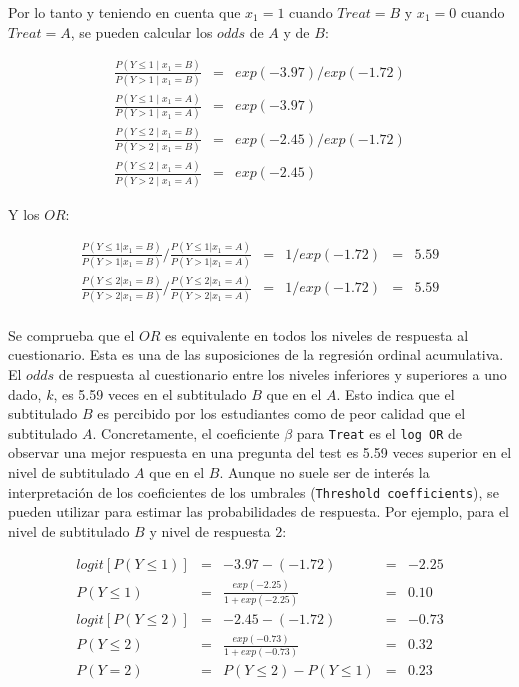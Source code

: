\documentclass[
  12pt,
  a4paper,
  extrafontsizes,
  onecolumn,
  openright,
  table]{memoir}
\begin{document}
Por lo tanto y teniendo en cuenta que \(x_1 = 1\) cuando \(Treat = B\) y
\(x_1 = 0\) cuando \(Treat = A\), se pueden calcular los \(odds\) de
\(A\) y de \(B\):

\[
\begin{aligned}
\frac{P(Y \le 1 \mid x_1 = B)}{P(Y > 1 \mid x_1 = B)} & = & exp(-3.97)/exp(-1.72) \\
\frac{P(Y \le 1 \mid x_1 = A)}{P(Y > 1 \mid x_1 = A)} & = & exp(-3.97) \\
\frac{P(Y \le 2 \mid x_1 = B)}{P(Y > 2 \mid x_1 = B)} & = & exp(-2.45)/exp(-1.72) \\
\frac{P(Y \le 2 \mid x_1 = A)}{P(Y > 2 \mid x_1 = A)} & = & exp(-2.45)
\end{aligned}
\]

Y los \(OR\):

\[
\begin{aligned}
\frac{P(Y \le 1 | x_1=B)}{P(Y > 1 | x_1=B)} / \frac{P(Y \le 1 | x_1=A)}{P(Y > 1 | x_1=A)} & = & 1/exp(-1.72) & = & 5.59 \\
\frac{P(Y \le 2 | x_1=B)}{P(Y > 2 | x_1=B)} / \frac{P(Y \le 2 | x_1=A)}{P(Y > 2 | x_1=A)} & = & 1/exp(-1.72) & = & 5.59 \\
\end{aligned}
\]

Se comprueba que el \(OR\) es equivalente en todos los niveles de
respuesta al cuestionario. Esta es una de las suposiciones de la
regresión ordinal acumulativa. El \(odds\) de respuesta al cuestionario
entre los niveles inferiores y superiores a uno dado, \(k\), es 5.59
veces en el subtitulado \(B\) que en el \(A\). Esto indica que el
subtitulado \(B\) es percibido por los estudiantes como de peor calidad
que el subtitulado \(A\). Concretamente, el coeficiente \(\beta\) para
\texttt{Treat} es el \texttt{log\ OR} de observar una mejor respuesta en
una pregunta del test es 5.59 veces superior en el nivel de subtitulado
\(A\) que en el \(B\). Aunque no suele ser de interés la interpretación
de los coeficientes de los umbrales (\texttt{Threshold\ coefficients}),
se pueden utilizar para estimar las probabilidades de respuesta. Por
ejemplo, para el nivel de subtitulado \(B\) y nivel de respuesta 2:

\[
\begin{aligned}
logit [P(Y \le 1)] & = & -3.97 - (-1.72) & = & -2.25 \\
P(Y \le 1) & = & \frac{exp(-2.25)}{1 + exp(-2.25)} & = & 0.10 \\
logit [P(Y \le 2)] & = & -2.45 - (-1.72) & = & -0.73 \\
P(Y \le 2) & = & \frac{exp(-0.73)}{1 + exp(-0.73)} & = & 0.32 \\
P(Y = 2) & = & P(Y \le 2) - P(Y \le 1) & = &  0.23 
\end{aligned}
\]
\end{document}
